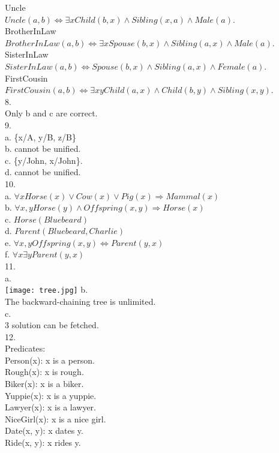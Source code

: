 \documentclass[a4paper]{article}
\begin{document}
\begin{enumerate}[1.]
Uncle\\
$Uncle(a,b) \Leftrightarrow \exists x Child(b, x) \wedge Sibling(x,a) \wedge Male(a)$.\\

BrotherInLaw\\
$BrotherInLaw(a,b) \Leftrightarrow \exists x Spouse(b,x) \wedge Sibling(a,x) \wedge Male(a)$.\\

SisterInLaw\\
$SisterInLaw(a,b) \Leftrightarrow Spouse(b,x) \wedge Sibling(a,x) \wedge Female(a)$.\\

FirstCousin\\
$FirstCousin(a,b) \Leftrightarrow \exists x y Child(a, x) \wedge Child(b, y) \wedge Sibling(x,y)$.\\

8.\\
Only b and c are correct.\\

9.\\
a. \{x/A, y/B, z/B\}\\
b. cannot be unified.\\
c. \{y/John, x/John\}.\\
d. cannot be unified.\\

10.\\
a. $\forall x Horse(x) \vee Cow(x) \vee Pig(x) \Rightarrow Mammal(x)$\\
b. $\forall x, y Horse(y) \wedge Offspring(x, y) \Rightarrow Horse(x)$\\
c. $Horse(Bluebeard)$\\
d. $Parent(Bluebeard, Charlie)$\\
e. $\forall x, y Offspring(x, y) \Leftrightarrow Parent(y, x)$\\
f. $\forall x \exists y Parent(y, x)$\\

11.\\
a.\\
\texttt{[image: tree.jpg]}
b.\\
The backward-chaining tree is unlimited.\\
c.\\
3 solution can be fetched.\\

12.\\
Predicates:\\
Person(x): x is a person.\\
Rough(x): x is rough.\\
Biker(x): x is a biker.\\
Yuppie(x): x is a yuppie.\\
Lawyer(x): x is a lawyer.\\
NiceGirl(x): x is a nice girl.\\
Date(x, y): x dates y.\\
Ride(x, y): x rides y.\\


\end{enumerate}
\end{document}
